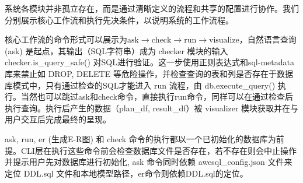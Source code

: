 \begin{CJK*}{UTF8}{song}

系统各模块并非孤立存在，而是通过清晰定义的流程和共享的配置进行协作。我们分别展示核心工作流和执行先决条件，以说明系统的工作流程。

核心工作流的命令形式可以展示为$\text{ask} \rightarrow \text{check} \rightarrow \text{run} \rightarrow \text{visualize}$，自然语言查询 (ask) 是起点，其输出（SQL字符串）成为 checker 模块的输入checker.is\_query\_safe() 对SQL进行验证。这一步使用正则表达式和sql-metadata库来禁止如 DROP, DELETE 等危险操作，并检查查询的表和列是否存在于数据库模式中，只有通过检查的SQL才能进入 run 流程，由 db.execute\_query() 执行。当然也可以跳过ask和check命令，直接执行run命令，同样可以在通过检查后执行查询。执行后产生的数据（plan\_df, result\_df）被 visualizer 模块获取并在与用户交互后完成最终的呈现。


 ask, run, er (生成E-R图) 和 check 命令的执行都以一个已初始化的数据库为前提。CLI层在执行这些命令前会检查数据库文件是否存在，若不存在则会中止操作并提示用户先对数据库进行初始化, ask 命令同时依赖 awesql\_config.json 文件来定位 DDL.sql 文件和本地模型路径，er命令则依赖DDL.sql的定位。
 

\end{CJK*}